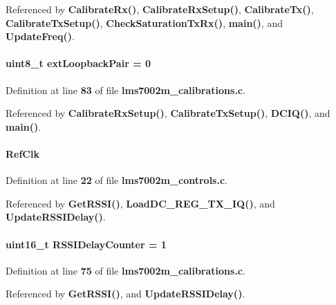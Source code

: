 Referenced by {\bf Calibrate\+Rx()}, {\bf Calibrate\+Rx\+Setup()}, {\bf Calibrate\+Tx()}, {\bf Calibrate\+Tx\+Setup()}, {\bf Check\+Saturation\+Tx\+Rx()}, {\bf main()}, and {\bf Update\+Freq()}.

\paragraph[{ext\+Loopback\+Pair}]{\setlength{\rightskip}{0pt plus 5cm}uint8\+\_\+t ext\+Loopback\+Pair = 0}\label{lms7002m__calibrations_8c_ac7d7f1c9dac1f8b84d0997fdc4cbc5a4}


Definition at line {\bf 83} of file {\bf lms7002m\+\_\+calibrations.\+c}.



Referenced by {\bf Calibrate\+Rx\+Setup()}, {\bf Calibrate\+Tx\+Setup()}, {\bf D\+C\+I\+Q()}, and {\bf main()}.

\paragraph[{Ref\+Clk}]{ Ref\+Clk}\label{lms7002m__calibrations_8c_ade9c63dab5fa56fdab2394edec268508}


Definition at line {\bf 22} of file {\bf lms7002m\+\_\+controls.\+c}.



Referenced by {\bf Get\+R\+S\+S\+I()}, {\bf Load\+D\+C\+\_\+\+R\+E\+G\+\_\+\+T\+X\+\_\+\+I\+Q()}, and {\bf Update\+R\+S\+S\+I\+Delay()}.

\paragraph[{R\+S\+S\+I\+Delay\+Counter}]{\setlength{\rightskip}{0pt plus 5cm}uint16\+\_\+t R\+S\+S\+I\+Delay\+Counter = 1}\label{lms7002m__calibrations_8c_a21b2e06a2670ac86af8ecf2322ceabcc}


Definition at line {\bf 75} of file {\bf lms7002m\+\_\+calibrations.\+c}.



Referenced by {\bf Get\+R\+S\+S\+I()}, and {\bf Update\+R\+S\+S\+I\+Delay()}.

